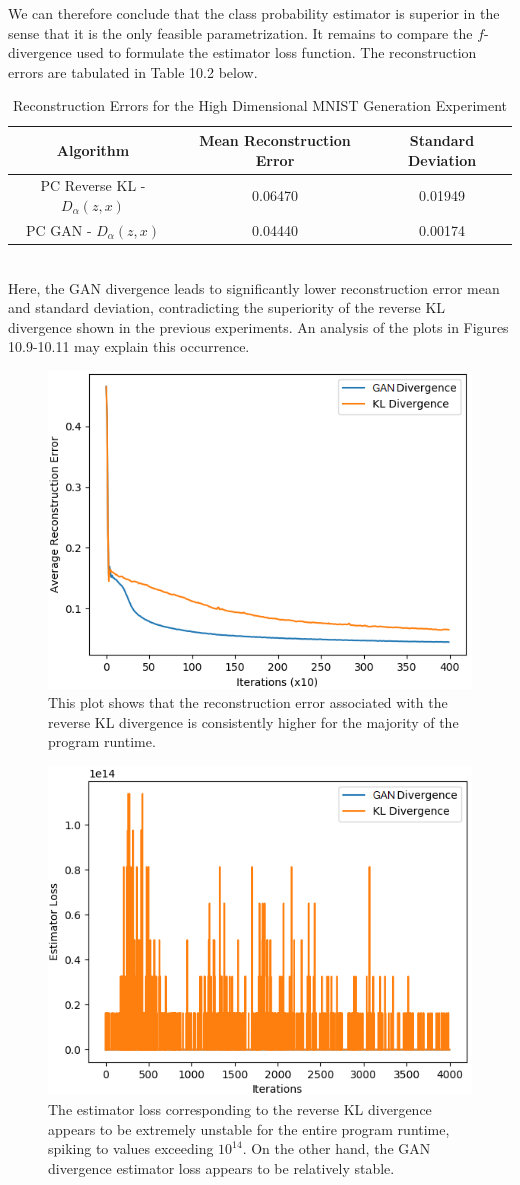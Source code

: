 \documentclass[honours,12pt]{unswthesis}
\numberwithin{equation}{section}
\theoremstyle{definition}
\begin{document}
We can therefore conclude that the class probability estimator is superior in the sense that it is the only feasible parametrization. It remains to compare the $f$-divergence used to formulate the estimator loss function. The reconstruction errors are tabulated in Table 10.2 below.
\begin{table}[h]
\centering
\begin{tabular}{|c|c|c|}
\hline
Algorithm & Mean Reconstruction Error & Standard Deviation\\
\hline
PC Reverse KL - $D_\alpha(z,x)$ & 0.06470 & 0.01949\\
\hline
PC GAN - $D_\alpha(z,x)$ & 0.04440 & 0.00174\\
\hline
\end{tabular}
\caption{Reconstruction Errors for the High Dimensional MNIST Generation Experiment}
\end{table}\\
Here, the GAN divergence leads to significantly lower reconstruction error mean and standard deviation, contradicting the superiority of the reverse KL divergence shown in the previous experiments. An analysis of the plots in Figures 10.9-10.11 may explain this occurrence.
\begin{figure}[h]
\centering
\includegraphics[width=0.49\linewidth]{part4reconerrors/PCADVvsPCKLD.png}
\caption{\small This plot shows that the reconstruction error associated with the reverse KL divergence is consistently higher for the majority of the program runtime.}
\end{figure}
\begin{figure}[h]
\centering
\includegraphics[width=0.49\linewidth]{part4estimatorlosses/PCADVvsPCKLD.png}
\caption{\small The estimator loss corresponding to the reverse KL divergence appears to be extremely unstable for the entire program runtime, spiking to values exceeding $10^{14}$. On the other hand, the GAN divergence estimator loss appears to be relatively stable.}
\end{figure}
\end{document}
